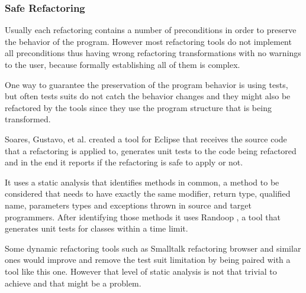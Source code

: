 
\subsubsection{Safe Refactoring}

Usually each refactoring contains a number of preconditions in order to preserve the behavior of the program. 
However most refactoring tools do not implement all preconditions thus having wrong refactoring transformations with no warnings to the user, because formally establishing all of them is complex.

One way to guarantee the preservation of the program behavior is using tests, but often tests suits do not catch the behavior changes and they might also be refactored by the tools since they use the program structure that is being transformed.

Soares, Gustavo, et al. \cite{soares2010making} created a tool for Eclipse that receives the source code that a refactoring is applied to, generates unit tests to the code being refactored and in the end it reports if the refactoring is safe to apply or not.

It uses a static analysis that identifies methods in common, a method to be considered that needs to have exactly the same modifier, return type, qualified name, parameters types and exceptions thrown in source and target programmers.
After identifying those methods it uses Randoop \cite{pacheco2007feedback},  %
 a tool that generates unit tests for classes within a time limit.

Some dynamic refactoring tools such as Smalltalk refactoring browser and similar ones would improve and remove the test suit limitation by being paired with a tool like this one. However that level of static analysis is not that trivial to achieve and that might be a problem. %